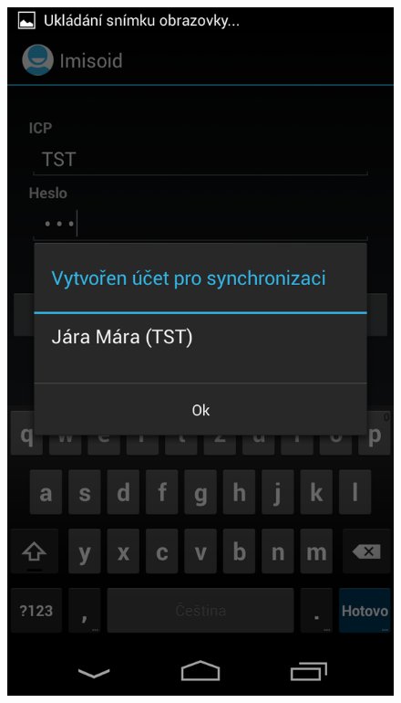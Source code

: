 \documentclass{diplomka}
\begin{document}
\begin{figure}[H]
\begin{minipage}{.45\textwidth}
  \includegraphics[width=.75\linewidth]{scr/accokdialog.png}
  \label{fig:accokdialog}
\end{minipage}
\end{figure}
\end{document}
